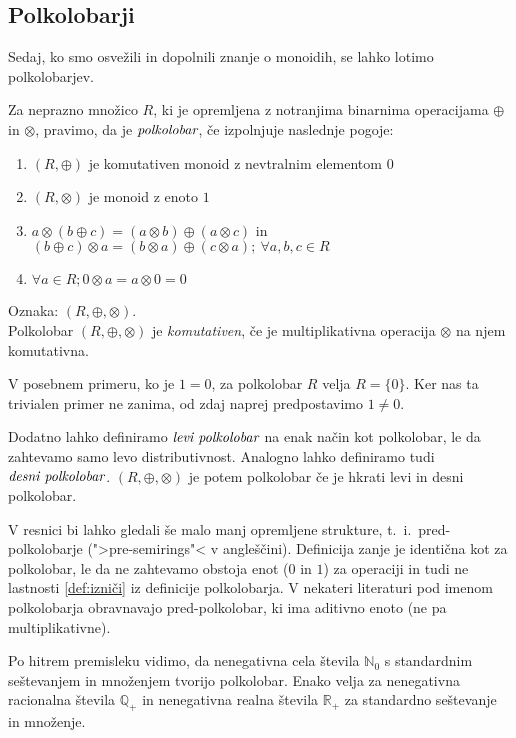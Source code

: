 \documentclass[mat1]{fmfdelo}
\newcommand{\N}{\mathbb{N}}
\newcommand{\No}{\N_0}
\newcommand{\Pplus}[1]{\mathbb{#1}_{+}}
\newcommand{\pojem}[1]{\ensuremath{\emph{#1}}}
\begin{document}
\subsection{Polkolobarji} \label{subsect:semiring}
Sedaj, ko smo osvežili in dopolnili znanje o monoidih, se lahko lotimo polkolobarjev.
\begin{definicija}
	Za neprazno množico $R$, ki je opremljena z notranjima binarnima operacijama $\oplus$ in $\otimes$, pravimo, da je \pojem{polkolobar}, če izpolnjuje naslednje pogoje:
	\begin{enumerate}
		\item $(R, \oplus)$ je komutativen monoid z nevtralnim elementom $0$
		\item $(R, \otimes)$ je monoid z enoto $1$
		\item $a\otimes(b \oplus c) = (a\otimes b) \oplus (a\otimes c)$ in $(b \oplus c)\otimes a = (b\otimes a) \oplus (c\otimes a);~\forall a, b, c\in R$
		\item  \label{def:izniči} $\forall a\in R; 0 \otimes a = a\otimes 0 = 0$
	\end{enumerate}
	Oznaka: $(R, \oplus, \otimes)$. \\ Polkolobar $(R, \oplus, \otimes)$ je \textit{komutativen}, če je multiplikativna operacija $\otimes$ na njem komutativna.
\end{definicija}
V posebnem primeru, ko je $1 = 0$, za polkolobar $R$ velja $R = \{0\}$. Ker nas ta trivialen primer ne zanima, od zdaj naprej predpostavimo $1 \neq 0$.
\begin{opomba}
	Dodatno lahko definiramo \pojem{levi polkolobar} na enak način kot polkolobar, le da zahtevamo samo levo distributivnost. Analogno lahko definiramo tudi \pojem{desni polkolobar}. $(R,\oplus, \otimes)$ je potem polkolobar če je hkrati levi in desni polkolobar.
\end{opomba}
\begin{opomba}
	V resnici bi lahko gledali še malo manj opremljene strukture, t.~i.~pred-polkolobarje (">pre-semirings"< v angleščini). Definicija zanje je identična kot za polkolobar, le da ne zahtevamo obstoja enot ($0$ in $1$) za operaciji in tudi ne lastnosti \ref{def:izniči} iz definicije polkolobarja. V nekateri literaturi pod imenom polkolobarja obravnavajo pred-polkolobar, ki ima aditivno enoto (ne pa multiplikativne).
\end{opomba}

Po hitrem premisleku vidimo, da nenegativna cela števila $\No$ s standardnim seštevanjem in množenjem tvorijo polkolobar. Enako velja za nenegativna racionalna števila $\Pplus{Q}$ in nenegativna realna števila $\Pplus{R}$ za standardno seštevanje in množenje.
\end{document}
